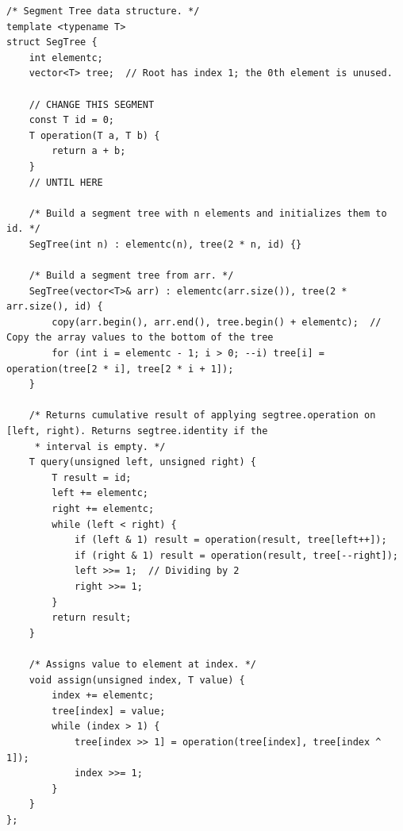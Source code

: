 \documentclass[a4paper,10pt]{article}
\newenvironment{keepfunction}{\begin{samepage}}{\end{samepage}}
\begin{document}
\begin{keepfunction}
\begin{verbatim}
/* Segment Tree data structure. */
template <typename T>
struct SegTree {
    int elementc;
    vector<T> tree;  // Root has index 1; the 0th element is unused.

    // CHANGE THIS SEGMENT
    const T id = 0;
    T operation(T a, T b) {
        return a + b;
    }
    // UNTIL HERE

    /* Build a segment tree with n elements and initializes them to id. */
    SegTree(int n) : elementc(n), tree(2 * n, id) {}

    /* Build a segment tree from arr. */
    SegTree(vector<T>& arr) : elementc(arr.size()), tree(2 * arr.size(), id) {
        copy(arr.begin(), arr.end(), tree.begin() + elementc);  // Copy the array values to the bottom of the tree
        for (int i = elementc - 1; i > 0; --i) tree[i] = operation(tree[2 * i], tree[2 * i + 1]);
    }

    /* Returns cumulative result of applying segtree.operation on [left, right). Returns segtree.identity if the
     * interval is empty. */
    T query(unsigned left, unsigned right) {
        T result = id;
        left += elementc;
        right += elementc;
        while (left < right) {
            if (left & 1) result = operation(result, tree[left++]);
            if (right & 1) result = operation(result, tree[--right]);
            left >>= 1;  // Dividing by 2
            right >>= 1;
        }
        return result;
    }

    /* Assigns value to element at index. */
    void assign(unsigned index, T value) {
        index += elementc;
        tree[index] = value;
        while (index > 1) {
            tree[index >> 1] = operation(tree[index], tree[index ^ 1]);
            index >>= 1;
        }
    }
};
\end{verbatim}
\end{keepfunction}
\end{document}
